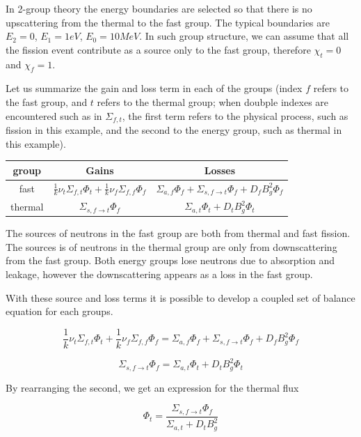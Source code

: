 In 2-group theory the energy boundaries are selected so that there is no upscattering from the thermal to the fast group. The typical boundaries are $E_2=0$, $E_1=1 eV$, $E_0=10 MeV$. In such group structure, we can assume that all the fission event contribute as a source only to the fast group, therefore $\chi_t=0$ and $\chi_f=1$.

Let us summarize the gain and loss term in each of the groups (index $f$ refers to the fast group, and $t$ refers to the thermal group; when doubple indexes are encountered such as in $\Sigma_{f,t}$, the first term refers to the physical process, such as fission in this example, and the second to the energy group, such as thermal in this example).


\begin{tabular}{c | c | c}
group & Gains & Losses \\
\hline
fast & $\frac{1}{k}\nu_t\Sigma_{f,t}\Phi_t+\frac{1}{k}\nu_f\Sigma_{f,f}\Phi_f$ & $\Sigma_{a,f}\Phi_f + \Sigma_{s,f\rightarrow t}\Phi_f + D_fB_g^2\Phi_f$  \\
\hline
thermal & $\Sigma_{s,f\rightarrow t}\Phi_f$ & $\Sigma_{a,t}\Phi_t  + D_tB_g^2\Phi_t$ 
\end{tabular}

The sources of neutrons in the fast group are both from thermal and fast fission. The sources is of neutrons in the thermal group are only from downscattering from the fast group. Both energy groups lose neutrons due to absorption and leakage, however the downscattering appears as a loss in the fast group.

With these source and loss terms it is possible to develop a coupled set of balance equation for each groups.

\begin{equation}
\frac{1}{k}\nu_t\Sigma_{f,t}\Phi_t+\frac{1}{k}\nu_f\Sigma_{f,f}\Phi_f=\Sigma_{a,f}\Phi_f + \Sigma_{s,f\rightarrow t}\Phi_f + D_fB_g^2\Phi_f 
\end{equation}

\begin{equation*}
\Sigma_{s,f\rightarrow t}\Phi_f = \Sigma_{a,t}\Phi_t  + D_tB_g^2\Phi_t
\end{equation*}


By rearranging the second, we get an expression for the thermal flux

\begin{equation}
\Phi_t=\frac{\Sigma_{s,f\rightarrow t}\Phi_f}{\Sigma_{a,t}  + D_tB_g^2}
\end{equation}

